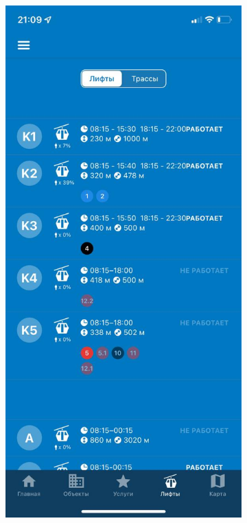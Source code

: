 \begin{figure}[h!]
\begin{center}
\begin{subfigure}{.33\textwidth}
		\label{img:gslope}
		\captionsetup{justification=centering}
		\caption{}
	\end{subfigure}%
	\begin{subfigure}{.33\textwidth}
		\centering
		\includegraphics[width=.95\linewidth]{../imgs/analogue_apps/glift.png}

\end{subfigure}
\end{center}
\end{figure}
